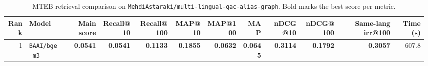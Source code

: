 \begin{table}[t]
\centering
\small
\begin{tabular}{r l r r r r r r r r r r}
\hline
Rank & Model & Main score & Recall@10 & Recall@100 & MAP@10 & MAP@100 & MAP & nDCG@10 & nDCG@100 & Same-lang irr@100 & Time (s) \\
\hline
1 & \texttt{BAAI/bge-m3} & \textbf{0.0541} & \textbf{0.0541} & \textbf{0.1133} & \textbf{0.1855} & \textbf{0.0632} & \textbf{0.0645} & \textbf{0.3114} & \textbf{0.1792} & \textbf{0.3057} & 607.8 \\
\hline
\end{tabular}
\caption{MTEB retrieval comparison on \texttt{MehdiAstaraki/multi-lingual-qac-alias-graph}. Bold marks the best score per metric.}
\label{tab:mteb-model-comparison}
\end{table}

